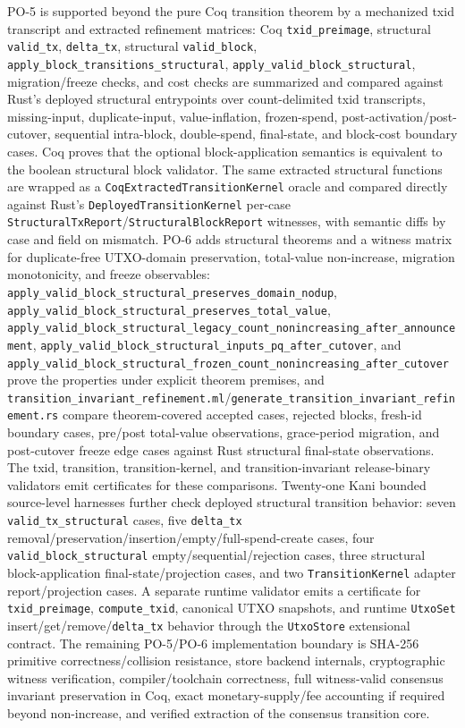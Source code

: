 \documentclass[11pt]{article}
\begin{document}
PO-5 is supported beyond the pure Coq transition theorem by a mechanized txid transcript and extracted refinement matrices: Coq \texttt{txid\_preimage}, structural \texttt{valid\_tx}, \texttt{delta\_tx}, structural \texttt{valid\_block}, \texttt{apply\_block\_transitions\_structural}, \texttt{apply\_valid\_block\_structural}, migration/freeze checks, and cost checks are summarized and compared against Rust's deployed structural entrypoints over count-delimited txid transcripts, missing-input, duplicate-input, value-inflation, frozen-spend, post-activation/post-cutover, sequential intra-block, double-spend, final-state, and block-cost boundary cases. Coq proves that the optional block-application semantics is equivalent to the boolean structural block validator. The same extracted structural functions are wrapped as a \texttt{CoqExtractedTransitionKernel} oracle and compared directly against Rust's \texttt{DeployedTransitionKernel} per-case \texttt{StructuralTxReport}/\texttt{StructuralBlockReport} witnesses, with semantic diffs by case and field on mismatch. PO-6 adds structural theorems and a witness matrix for duplicate-free UTXO-domain preservation, total-value non-increase, migration monotonicity, and freeze observables: \texttt{apply\_valid\_block\_structural\_preserves\_domain\_nodup}, \texttt{apply\_valid\_block\_structural\_preserves\_total\_value}, \texttt{apply\_valid\_block\_structural\_legacy\_count\_nonincreasing\_after\_announcement}, \texttt{apply\_valid\_block\_structural\_inputs\_pq\_after\_cutover}, and \texttt{apply\_valid\_block\_structural\_frozen\_count\_nonincreasing\_after\_cutover} prove the properties under explicit theorem premises, and \texttt{transition\_invariant\_refinement.ml}/\texttt{generate\_transition\_invariant\_refinement.rs} compare theorem-covered accepted cases, rejected blocks, fresh-id boundary cases, pre/post total-value observations, grace-period migration, and post-cutover freeze edge cases against Rust structural final-state observations. The txid, transition, transition-kernel, and transition-invariant release-binary validators emit certificates for these comparisons. Twenty-one Kani bounded source-level harnesses further check deployed structural transition behavior: seven \texttt{valid\_tx\_structural} cases, five \texttt{delta\_tx} removal/preservation/insertion/empty/full-spend-create cases, four \texttt{valid\_block\_structural} empty/sequential/rejection cases, three structural block-application final-state/projection cases, and two \texttt{TransitionKernel} adapter report/projection cases. A separate runtime validator emits a certificate for \texttt{txid\_preimage}, \texttt{compute\_txid}, canonical UTXO snapshots, and runtime \texttt{UtxoSet} insert/get/remove/\texttt{delta\_tx} behavior through the \texttt{UtxoStore} extensional contract. The remaining PO-5/PO-6 implementation boundary is SHA-256 primitive correctness/collision resistance, store backend internals, cryptographic witness verification, compiler/toolchain correctness, full witness-valid consensus invariant preservation in Coq, exact monetary-supply/fee accounting if required beyond non-increase, and verified extraction of the consensus transition core.
\end{document}
